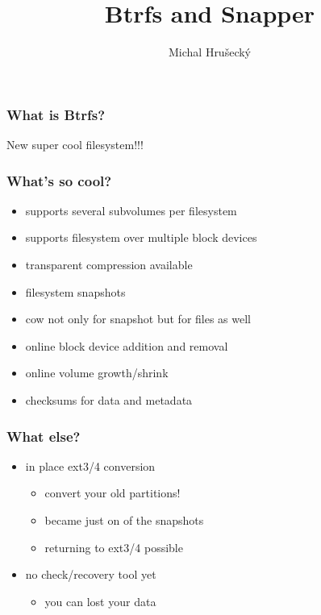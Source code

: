 \documentclass{beamer}
\author{Michal Hru\v{s}eck\'{y}\newline {\small openSUSE Boosters}}
\title{Btrfs and Snapper}
\begin{document}
\begin{frame}[t,plain]
\titlepage
\end{frame}


\begin{frame}
\frametitle{What is Btrfs?}
\begin{center}
\Huge New super cool filesystem!!!
\end{center}
\end{frame}

\begin{frame}[t]
\frametitle{What's so cool?}
\begin{itemize}
   \item supports several subvolumes per filesystem
   \item supports filesystem over multiple block devices
   \item transparent compression available
   \item filesystem snapshots
   \item cow not only for snapshot but for files as well
   \item online block device addition and removal
   \item online volume growth/shrink
   \item checksums for data and metadata
\end{itemize}
\end{frame}

\begin{frame}[t]
\frametitle{What else?}
\begin{center}
\begin{itemize}
   \item in place ext3/4 conversion
   \begin{itemize}
      \item convert your old partitions!
      \item became just on of the snapshots
      \item returning to ext3/4 possible
   \end{itemize}
   \item no check/recovery tool yet
   \begin{itemize}
      \item you can lost your data 
   \end{itemize}
\end{itemize}
\end{center}
\end{frame}
\end{document}
